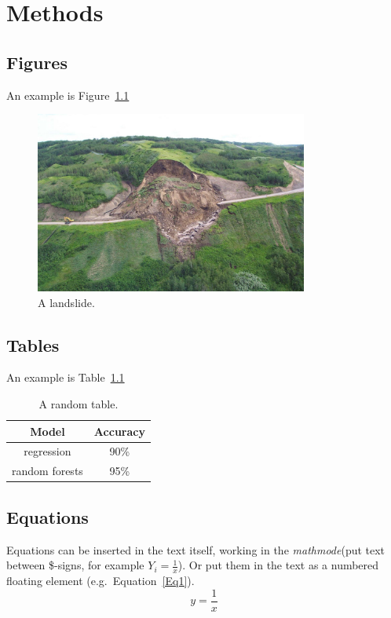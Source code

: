 \chapter{Methods}

\section{Figures}
An example is Figure~\ref{Landslide}
\begin{figure}[h] %
    \centering %
    \includegraphics[width=0.8\textwidth]{Figures/landslide3.jpg}
    \caption{A landslide.}
    \label{Landslide}
\end{figure}

\newpage

\section{Tables}
An example is Table~\ref{Tabel1}
\begin{table}[h]
    \centering
    \begin{tabular}{|c|c|}
        \hline
       \bf Model  & \bf Accuracy  \\ \hline
        regression & 90\%                \\ \hline
        random forests & 95\%           \\ \hline
    \end{tabular}
    \caption{A random table.}
    \label{Tabel1}
\end{table}

\newpage

\section{Equations}
Equations can be inserted in the text itself, working in the \textit{mathmode}(put text between \$-signs, for example $Y_i=\frac{1}{x}$). Or put them in the text as a numbered floating element (e.g.\ Equation~\eqref{Eq1}).
\begin{equation}\label{Eq1}
    y=\frac{1}{x}
\end{equation}

